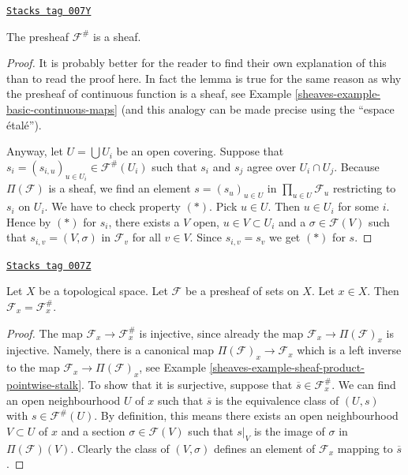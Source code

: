 \begin{lemma}
\label{sheaves-lemma-sheafification-sheaf}
\href{https://stacks.math.columbia.edu/tag/007Y}{\texttt{Stacks tag 007Y}}

The presheaf $\mathcal{F}^{\#}$ is a sheaf.
\end{lemma}

\begin{proof}

It is probably better for the reader to find their own explanation
of this than to read the proof here. In fact the lemma is true
for the same reason as why the presheaf of continuous
function is a sheaf, see Example \ref{sheaves-example-basic-continuous-maps}
(and this analogy can be made precise using the ``espace \'etal\'e'').

\medskip\noindent
Anyway, let $U = \bigcup U_i$ be an open covering.
Suppose that $s_i = (s_{i, u})_{u \in U_i} \in \mathcal{F}^{\#}(U_i)$
such that $s_i$ and $s_j$ agree over $U_i \cap U_j$.
Because $\Pi(\mathcal{F})$ is a sheaf,
we find an element $s = (s_u)_{u\in U}$ in $\prod_{u\in U} \mathcal{F}_u$
restricting to $s_i$ on $U_i$. We have to check property $(*)$.
Pick $u \in U$. Then $u \in U_i$ for some $i$. Hence by $(*)$ for $s_i$,
there exists a $V$ open, $u \in V \subset U_i$
and a $\sigma \in \mathcal{F}(V)$
such that $s_{i, v} = (V, \sigma)$ in $\mathcal{F}_v$
for all $v \in V$. Since $s_{i, v} = s_v$ we get $(*)$ for $s$.
\end{proof}

\begin{lemma}
\label{sheaves-lemma-stalk-sheafification}
\href{https://stacks.math.columbia.edu/tag/007Z}{\texttt{Stacks tag 007Z}}

Let $X$ be a topological space.
Let $\mathcal{F}$ be a presheaf of sets on $X$.
Let $x \in X$. Then $\mathcal{F}_x = \mathcal{F}^\#_x$.
\end{lemma}

\begin{proof}

The map $\mathcal{F}_x \to \mathcal{F}^\#_x$
is injective, since already the map
$\mathcal{F}_x \to \Pi(\mathcal{F})_x$ is injective.
Namely, there is a canonical map $\Pi(\mathcal{F})_x \to \mathcal{F}_x$
which is a left inverse to the map $\mathcal{F}_x \to \Pi(\mathcal{F})_x$,
see Example \ref{sheaves-example-sheaf-product-pointwise-stalk}.
To show that it is surjective, suppose that
$\overline{s} \in \mathcal{F}^\#_x$.
We can find an open neighbourhood $U$ of $x$ such that
$\overline{s}$ is the equivalence class of $(U, s)$
with $s \in \mathcal{F}^\#(U)$.
By definition, this means there exists an open neighbourhood
$V \subset U$ of $x$ and a section $\sigma \in \mathcal{F}(V)$
such that $s|_V$ is the image of $\sigma$ in $\Pi(\mathcal{F})(V)$.
Clearly the class of $(V, \sigma)$ defines an element of
$\mathcal{F}_x$ mapping to $\overline{s}$.
\end{proof}

